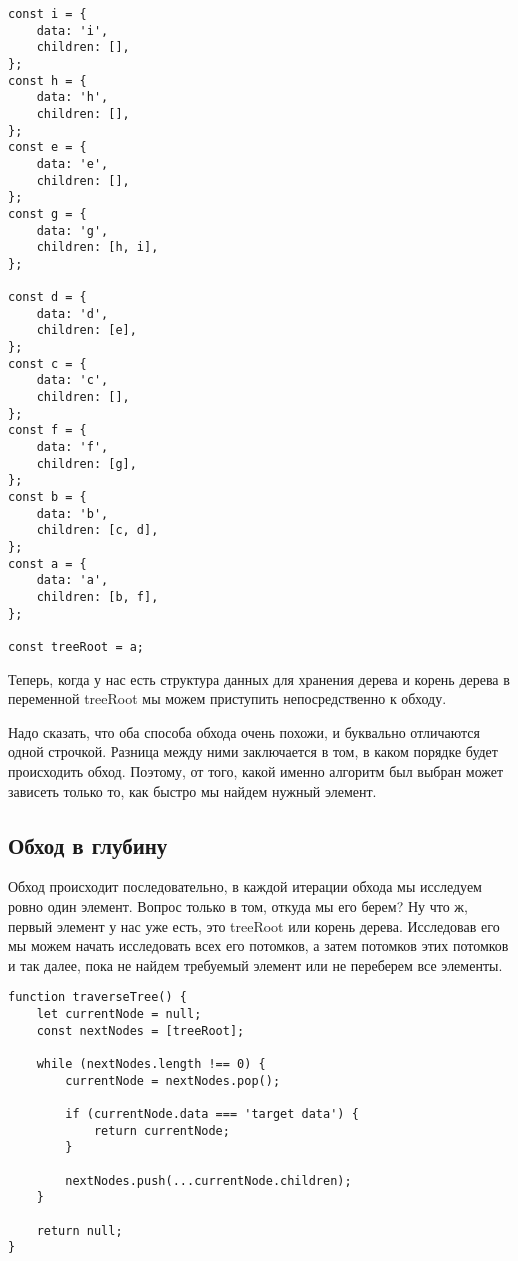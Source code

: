 \documentclass[../../article]{subfiles}
\begin{document}
    \begin{ruledelement}
        \begin{lstlisting}[caption={Пример {\firacodebold treeRoot}}, label={lst:treeJson}]
const i = {
    data: 'i',
    children: [],
};
const h = {
    data: 'h',
    children: [],
};
const e = {
    data: 'e',
    children: [],
};
const g = {
    data: 'g',
    children: [h, i],
};

const d = {
    data: 'd',
    children: [e],
};
const c = {
    data: 'c',
    children: [],
};
const f = {
    data: 'f',
    children: [g],
};
const b = {
    data: 'b',
    children: [c, d],
};
const a = {
    data: 'a',
    children: [b, f],
};

const treeRoot = a;
        \end{lstlisting}
    \end{ruledelement}


Теперь, когда у нас есть структура данных для хранения дерева и корень дерева в переменной {\firacodebold treeRoot} мы можем приступить непосредственно к обходу.

Надо сказать, что оба способа обхода очень похожи, и буквально отличаются одной строчкой. Разница между ними заключается в том, в каком порядке будет происходить обход. Поэтому, от того, какой именно алгоритм был выбран может зависеть только то, как быстро мы найдем нужный элемент.

\subsection{Обход в глубину}

Обход происходит последовательно, в каждой итерации обхода мы исследуем ровно один элемент. Вопрос только в том, откуда мы его берем? Ну что ж, первый элемент у нас уже есть, это {\firacodebold treeRoot} или корень дерева. Исследовав его мы можем начать исследовать всех его потомков, а затем потомков этих потомков и так далее, пока не найдем требуемый элемент или не переберем все элементы.

\begin{figure*}
    \begin{ruledelement}
        \begin{lstlisting}[caption={Обход дерева в глубину}, label={lst:treeDfs}]
function traverseTree() {
    let currentNode = null;
    const nextNodes = [treeRoot];

    while (nextNodes.length !== 0) {
        currentNode = nextNodes.pop();

        if (currentNode.data === 'target data') {
            return currentNode;
        }

        nextNodes.push(...currentNode.children);
    }

    return null;
}
        \end{lstlisting}
    \end{ruledelement}
\end{figure*}
\end{document}
